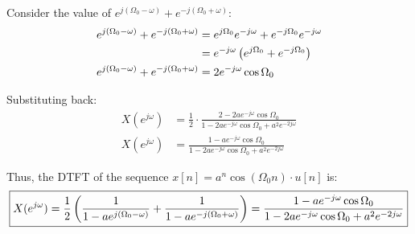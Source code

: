 \documentclass[a4paper, 10pt]{article}
\begin{document}
\begin{tosubmit}
Consider the value of \( e^{j (\Omega_0 - \omega)} + e^{-j (\Omega_0 + \omega)} \):
\begin{align*}
    e^{j (\Omega_0 - \omega)} + e^{-j (\Omega_0 + \omega)} &= e^{j \Omega_0} e^{-j \omega} + e^{-j \Omega_0} e^{-j \omega} \\
    &= e^{-j \omega} \left( e^{j \Omega_0} + e^{-j \Omega_0} \right) \\
    e^{j (\Omega_0 - \omega)} + e^{-j (\Omega_0 + \omega)} &= 2 e^{-j \omega} \cos{\Omega_0}
\end{align*}

Substituting back:
\begin{align*}
    X(e^{j\omega}) &= \frac{1}{2} \cdot \frac{ 2 - 2 a e^{-j \omega} \cos{\Omega_0} }{1 - 2 a e^{-j \omega} \cos{\Omega_0} + a^2 e^{-2j\omega}} \\
    X(e^{j\omega}) &= \frac{ 1 - a e^{-j \omega} \cos{\Omega_0} }{1 - 2 a e^{-j \omega} \cos{\Omega_0} + a^2 e^{-2j\omega}}
\end{align*}

Thus, the DTFT of the sequence \( x[n] = a^{n} \cos (\Omega_0 n) \cdot  u[n] \) is:
\[ \boxed{ X(e^{j\omega}) = \frac{1}{2} \left( \frac{1}{1 - a e^{j (\Omega_0 - \omega)}} + \frac{1}{1 - a e^{-j (\Omega_0 + \omega)}} \right) = \frac{ 1 - a e^{-j \omega} \cos{\Omega_0} }{1 - 2 a e^{-j \omega} \cos{\Omega_0} + a^2 e^{-2j\omega}} } \]
\end{tosubmit}

\newpage
\end{document}
